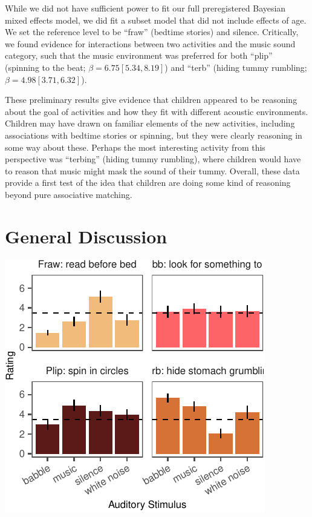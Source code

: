 \documentclass[10pt, letterpaper]{article}
\newenvironment{CodeChunk}{}{}
\begin{document}
While we did not have sufficient power to fit our full preregistered
Bayesian mixed effects model, we did fit a subset model that did not
include effects of age. We set the reference level to be ``fraw''
(bedtime stories) and silence. Critically, we found evidence for
interactions between two activities and the music sound category, such
that the music environment was preferred for both ``plip'' (spinning to
the beat; \(\beta = 6.75 [5.34, 8.19]\)) and ``terb'' (hiding tummy
rumbling; \(\beta = 4.98 [3.71, 6.32]\)).

These preliminary results give evidence that children appeared to be
reasoning about the goal of activities and how they fit with different
acoustic environments. Children may have drawn on familiar elements of
the new activities, including associations with bedtime stories or
spinning, but they were clearly reasoning in some way about these.
Perhaps the most interesting activity from this perspective was
``terbing'' (hiding tummy rumbling), where children would have to reason
that music might mask the sound of their tummy. Overall, these data
provide a first test of the idea that children are doing some kind of
reasoning beyond pure associative matching.

\hypertarget{general-discussion}{%
\section{General Discussion}\label{general-discussion}}

\begin{CodeChunk}

\includegraphics{figs/e4a-data-1} \end{CodeChunk}
\end{document}
